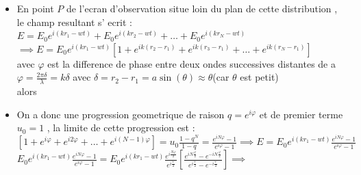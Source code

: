 \documentclass[12pt]{book}
\begin{document}
            \begin{itemize}
                \item En point $P$ de l'ecran d'observation situe loin du plan de cette distribution , le champ resultant s' ecrit :\\
                        $E=E_0e^{i(kr_1-wt)}+E_0e^{i(kr_2-wt)}+\ldots+E_0e^{i(kr_N-wt)} $\\
                        $\implies E=E_0e^{i(kr_1-wt)}\left[1+e^{ik(r_2-r_1)}+e^{ik(r_3-r_1)}+\ldots+e^{ik(r_N-r_1)}\right] $\\ 
                        avec $\varphi$ est la difference de phase entre deux ondes successives distantes de a \\
                        $\varphi=\frac{2\pi\delta}{\lambda}=k\delta $ avec $\delta = r_2 - r_1 = a\sin(\theta) \approx \theta$(car $\theta$ est petit)\\
                        alors 
                \item On a donc une progression geometrique de raison $q=e^{i\varphi}$ et de premier terme $u_0 =1$ , la limite de cette progression est : \\
                    $[1+e^{i\varphi}+e^{i2\varphi}+\ldots+e^{i(N-1)\varphi}]=u_0\frac{1-q^N}{1-q} = \frac{e^{iN\varphi}-1}{e^{i\varphi} - 1} \implies E=E_0e^{i(kr_1-wt)}\frac{e^{iN\varphi}-1}{e^{i\varphi} - 1} $
                    $E_0e^{i(kr_1-wt)}\frac{e^{iN\varphi}-1}{e^{i\varphi} - 1} = E_0e^{i(kr_1-wt)}\frac{e^{i\frac{N\varphi}{2}}}{e^{i\frac{\varphi}{2}}}\left[ \frac{e^{iN\frac{\varphi}{2}} - e^{-iN\frac{\varphi}{2}}}{e^{i\frac{\varphi}{2}}- e^{-i\frac{\varphi}{2}}} \right] \implies $ \\
                 

\end{itemize}
\end{document}
